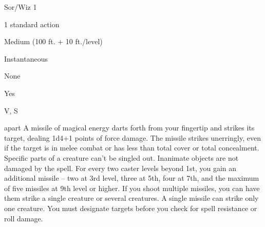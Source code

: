 
\begin{description*}
\item[Level:] Sor/Wiz 1
\item[Casting Time:] 1 standard action
\item[Range:] Medium (100 ft. + 10 ft./level)
\item[Duration:] Instantaneous
\item[Saving Throw:] None
\item[Spell Resistance:] Yes
\item[Components:] V, S
\end{description*}

apart
A missile of magical energy darts forth from your fingertip and strikes its target,
dealing 1d4+1 points of force damage.
The missile strikes unerringly, even if the target is in melee combat or has less
than total cover or total concealment. Specific parts of a creature can't be singled
out. Inanimate objects are not damaged by the spell.
For every two caster levels beyond 1st, you gain an additional missile -- two at
3rd level, three at 5th, four at 7th, and the maximum of five missiles at 9th level
or higher. If you shoot multiple missiles, you can have them strike a single creature
or several creatures. A single missile can strike only one creature. You must designate
targets before you check for spell resistance or roll damage.